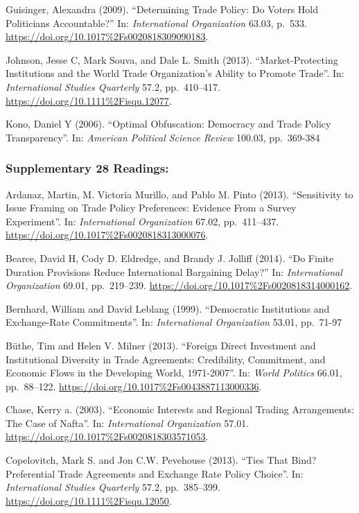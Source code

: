 \documentclass[10pt,]{article}
\begin{document}
Guisinger, Alexandra (2009). ``Determining Trade Policy: Do Voters Hold
Politicians Accountable?'' In: \emph{International Organization} 63.03,
p.~533. \url{https://doi.org/10.1017\%2Fs0020818309090183}.

Johnson, Jesse C, Mark Souva, and Dale L. Smith (2013).
``Market-Protecting Institutions and the World Trade Organization's
Ability to Promote Trade''. In: \emph{International Studies Quarterly}
57.2, pp.~410--417. \url{https://doi.org/10.1111\%2Fisqu.12077}.

Kono, Daniel Y (2006). ``Optimal Obfuscation: Democracy and Trade Policy
Transparency''. In: \emph{American Political Science Review} 100.03,
pp.~369-384

\subsubsection{Supplementary \textbar{} 28
Readings:}\label{supplementary-28-readings}

Ardanaz, Martin, M. Victoria Murillo, and Pablo M. Pinto (2013).
``Sensitivity to Issue Framing on Trade Policy Preferences: Evidence
From a Survey Experiment''. In: \emph{International Organization} 67.02,
pp.~411--437. \url{https://doi.org/10.1017\%2Fs0020818313000076}.

Bearce, David H, Cody D. Eldredge, and Brandy J. Jolliff (2014). ``Do
Finite Duration Provisions Reduce International Bargaining Delay?'' In:
\emph{International Organization} 69.01, pp.~219--239.
\url{https://doi.org/10.1017\%2Fs0020818314000162}.

Bernhard, William and David Leblang (1999). ``Democratic Institutions
and Exchange-Rate Commitments''. In: \emph{International Organization}
53.01, pp.~71-97

Büthe, Tim and Helen V. Milner (2013). ``Foreign Direct Investment and
Institutional Diversity in Trade Agreements: Credibility, Commitment,
and Economic Flows in the Developing World, 1971-2007''. In:
\emph{World Politics} 66.01, pp.~88--122.
\url{https://doi.org/10.1017\%2Fs0043887113000336}.

Chase, Kerry a. (2003). ``Economic Interests and Regional Trading
Arrangements: The Case of Nafta''. In: \emph{International Organization}
57.01. \url{https://doi.org/10.1017\%2Fs0020818303571053}.

Copelovitch, Mark S. and Jon C.W. Pevehouse (2013). ``Ties That Bind?
Preferential Trade Agreements and Exchange Rate Policy Choice''. In:
\emph{International Studies Quarterly} 57.2, pp.~385--399.
\url{https://doi.org/10.1111\%2Fisqu.12050}.
\end{document}
